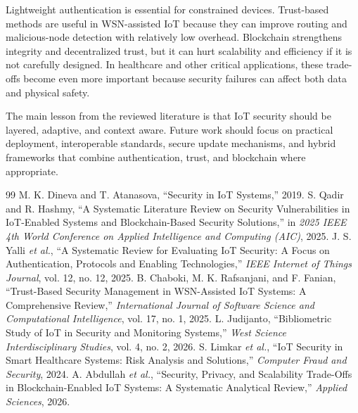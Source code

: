 \documentclass[conference]{IEEEtran}
\begin{document}
Lightweight authentication is essential for constrained devices. Trust-based methods are useful in WSN-assisted IoT because they can improve routing and malicious-node detection with relatively low overhead. Blockchain strengthens integrity and decentralized trust, but it can hurt scalability and efficiency if it is not carefully designed. In healthcare and other critical applications, these trade-offs become even more important because security failures can affect both data and physical safety.

The main lesson from the reviewed literature is that IoT security should be layered, adaptive, and context aware. Future work should focus on practical deployment, interoperable standards, secure update mechanisms, and hybrid frameworks that combine authentication, trust, and blockchain where appropriate.

\begin{thebibliography}{99}
 M. K. Dineva and T. Atanasova, ``Security in IoT Systems,'' 2019.
 S. Qadir and R. Hashmy, ``A Systematic Literature Review on Security Vulnerabilities in IoT-Enabled Systems and Blockchain-Based Security Solutions,'' in \emph{2025 IEEE 4th World Conference on Applied Intelligence and Computing (AIC)}, 2025.
 J. S. Yalli \emph{et al.}, ``A Systematic Review for Evaluating IoT Security: A Focus on Authentication, Protocols and Enabling Technologies,'' \emph{IEEE Internet of Things Journal}, vol. 12, no. 12, 2025.
 B. Chaboki, M. K. Rafsanjani, and F. Fanian, ``Trust-Based Security Management in WSN-Assisted IoT Systems: A Comprehensive Review,'' \emph{International Journal of Software Science and Computational Intelligence}, vol. 17, no. 1, 2025.
 L. Judijanto, ``Bibliometric Study of IoT in Security and Monitoring Systems,'' \emph{West Science Interdisciplinary Studies}, vol. 4, no. 2, 2026.
 S. Limkar \emph{et al.}, ``IoT Security in Smart Healthcare Systems: Risk Analysis and Solutions,'' \emph{Computer Fraud and Security}, 2024.
 A. Abdullah \emph{et al.}, ``Security, Privacy, and Scalability Trade-Offs in Blockchain-Enabled IoT Systems: A Systematic Analytical Review,'' \emph{Applied Sciences}, 2026.
\end{thebibliography}
\end{document}
